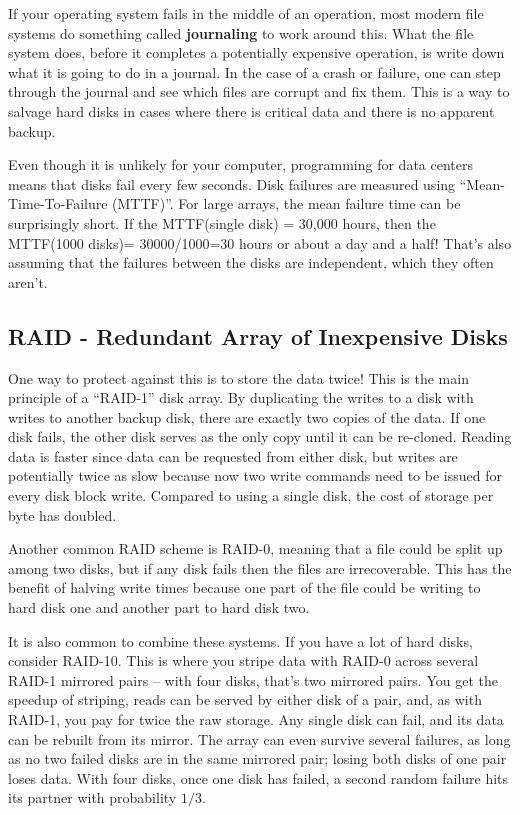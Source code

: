 If your operating system fails in the middle of an operation, most modern file systems do something called \textbf{journaling} to work around this.
What the file system does, before it completes a potentially expensive operation, is write down what it is going to do in a journal.
In the case of a crash or failure, one can step through the journal and see which files are corrupt and fix them.
This is a way to salvage hard disks in cases where there is critical data and there is no apparent backup.

Even though it is unlikely for your computer, programming for data centers means that disks fail every few seconds.
Disk failures are measured using ``Mean-Time-To-Failure (MTTF)''.
For large arrays, the mean failure time can be surprisingly short.
If the MTTF(single disk) = 30,000 hours, then the MTTF(1000 disks)= 30000/1000=30 hours or about a day and a half!
That's also assuming that the failures between the disks are independent, which they often aren't.

\subsection{RAID - Redundant Array of Inexpensive Disks}

One way to protect against this is to store the data twice! This is the main principle of a ``RAID-1'' disk array.
By duplicating the writes to a disk with writes to another backup disk, there are exactly two copies of the data.
If one disk fails, the other disk serves as the only copy until it can be re-cloned.
Reading data is faster since data can be requested from either disk, but writes are potentially twice as slow because now two write commands need to be issued for every disk block write.
Compared to using a single disk, the cost of storage per byte has doubled.

Another common RAID scheme is RAID-0, meaning that a file could be split up among two disks, but if any disk fails then the files are irrecoverable.
This has the benefit of halving write times because one part of the file could be writing to hard disk one and another part to hard disk two.


It is also common to combine these systems.
If you have a lot of hard disks, consider RAID-10.
This is where you stripe data with RAID-0 across several RAID-1 mirrored pairs -- with four disks, that's two mirrored pairs.
You get the speedup of striping, reads can be served by either disk of a pair, and, as with RAID-1, you pay for twice the raw storage.
Any single disk can fail, and its data can be rebuilt from its mirror.
The array can even survive several failures, as long as no two failed disks are in the same mirrored pair; losing both disks of one pair loses data.
With four disks, once one disk has failed, a second random failure hits its partner with probability $1/3$.

